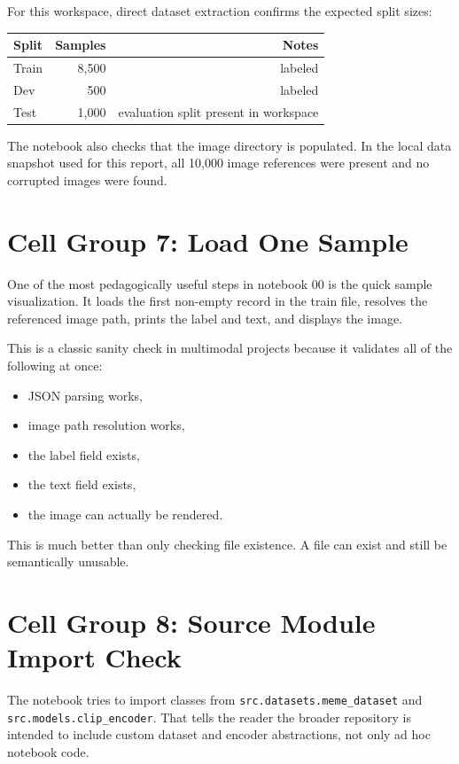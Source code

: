 \documentclass[11pt,a4paper]{report}
\begin{document}
For this workspace, direct dataset extraction confirms the expected split sizes:

\begin{center}
\begin{tabular}{lrr}
\toprule
Split & Samples & Notes \\
\midrule
Train & 8,500 & labeled \\
Dev & 500 & labeled \\
Test & 1,000 & evaluation split present in workspace \\
\bottomrule
\end{tabular}
\end{center}

The notebook also checks that the image directory is populated. In the local data snapshot used for this report, all 10,000 image references were present and no corrupted images were found.

\section{Cell Group 7: Load One Sample}

One of the most pedagogically useful steps in notebook 00 is the quick sample visualization. It loads the first non-empty record in the train file, resolves the referenced image path, prints the label and text, and displays the image.

This is a classic sanity check in multimodal projects because it validates all of the following at once:

\begin{itemize}
\item JSON parsing works,
\item image path resolution works,
\item the label field exists,
\item the text field exists,
\item the image can actually be rendered.
\end{itemize}

This is much better than only checking file existence. A file can exist and still be semantically unusable.

\section{Cell Group 8: Source Module Import Check}

The notebook tries to import classes from \texttt{src.datasets.meme\_dataset} and \texttt{src.models.clip\_encoder}. That tells the reader the broader repository is intended to include custom dataset and encoder abstractions, not only ad hoc notebook code.
\end{document}
